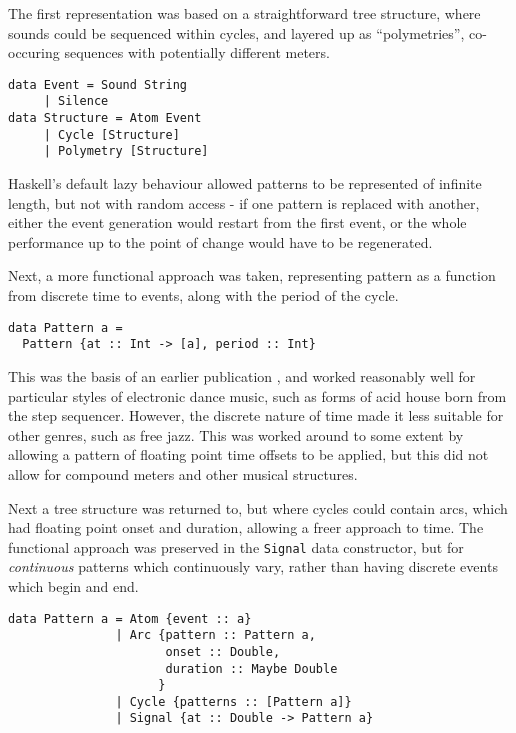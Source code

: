 \documentclass[authoryear,preprint]{sigplanconf}
\begin{document}
The first representation was based on a straightforward tree
structure, where sounds could be sequenced within cycles, and layered
up as ``polymetries'', co-occuring sequences with potentially
different meters.

\begin{lstlisting}
data Event = Sound String
     | Silence
data Structure = Atom Event
     | Cycle [Structure]
     | Polymetry [Structure]
\end{lstlisting}

Haskell's default lazy behaviour allowed patterns to be represented of
infinite length, but not with random access - if one pattern is
replaced with another, either the event generation would restart from
the first event, or the whole performance up to the point of change
would have to be regenerated.

Next, a more functional approach was taken, representing pattern as a
function from discrete time to events, along with the period of the
cycle.

\begin{lstlisting}
data Pattern a =
  Pattern {at :: Int -> [a], period :: Int}
\end{lstlisting}

This was the basis of an earlier publication \citep{McLean10d}, and
worked reasonably well for particular styles of electronic dance
music, such as forms of acid house born from the step
sequencer. However, the discrete nature of time made it less suitable for
other genres, such as free jazz. This was worked around to some extent
by allowing a pattern of floating point time offsets to be applied,
but this did not allow for compound meters and other musical
structures.

Next a tree structure was returned to, but where cycles could contain
arcs, which had floating point onset and duration, allowing a freer
approach to time. The functional approach was preserved in the
\lstinline{Signal} data constructor, but for \emph{continuous}
patterns which continuously vary, rather than having discrete events
which begin and end.

\begin{lstlisting}
data Pattern a = Atom {event :: a}
               | Arc {pattern :: Pattern a,
                      onset :: Double,
                      duration :: Maybe Double
                     }
               | Cycle {patterns :: [Pattern a]}
               | Signal {at :: Double -> Pattern a}
\end{lstlisting}
\end{document}
